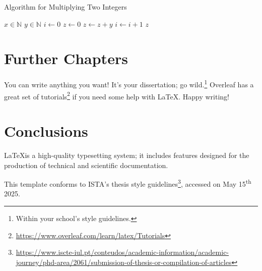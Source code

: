 \documentclass[12pt,reqno,twoside]{amsbook}
\begin{document}
\begin{algorithm}
    \caption{Algorithm for Multiplying Two Integers}
    \begin{algorithmic}
        \Require $x\in\mathbb{N}$
        \Require $y\in\mathbb{N}$
        \State $i \gets 0$
        \State $z \gets 0$
            \State $z \gets z + y$
            \State $i \gets i + 1$
        \EndWhile
        \State \Return $z$
    \end{algorithmic}
    \label{alg:example}
\end{algorithm}










\chapter{Further Chapters}

You can write anything you want! It's your dissertation; go wild.\footnote{Within your school's style guidelines.} Overleaf has a great set of tutorials\footnote{\url{https://www.overleaf.com/learn/latex/Tutorials}} if you need some help with \LaTeX. Happy writing!










\chapter{Conclusions}

\LaTeX\space is a high-quality typesetting system; it includes features designed for the production of technical and scientific documentation.

This template conforms to ISTA's thesis style guidelines\footnote{\url{https://www.iscte-iul.pt/conteudos/academic-information/academic-journey/phd-area/2061/submission-of-thesis-or-compilation-of-articles}}, accessed on May 15\textsuperscript{th} 2025.
\end{document}

